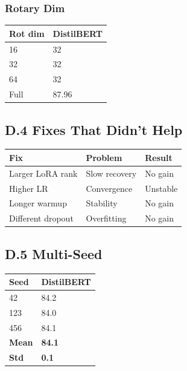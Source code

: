 {\subsubsection{Rotary Dim}

\begin{table}[H]
\centering
\small
\begin{tabular}{ll}
\toprule
\textbf{Rot dim} & \textbf{DistilBERT} \\
\midrule
16 & 32 \\
32 & 32 \\
64 & 32 \\
Full & 87.96 \\
\bottomrule
\end{tabular}
\end{table}

\subsection{D.4 Fixes That Didn't Help}

\begin{table}[H]
\centering
\small
\begin{tabular}{lll}
\toprule
\textbf{Fix} & \textbf{Problem} & \textbf{Result} \\
\midrule
Larger LoRA rank & Slow recovery & No gain \\
Higher LR & Convergence & Unstable \\
Longer warmup & Stability & No gain \\
Different dropout & Overfitting & No gain \\
\bottomrule
\end{tabular}
\end{table}

\subsection{D.5 Multi-Seed}

\begin{table}[H]
\centering
\small
\begin{tabular}{ll}
\toprule
\textbf{Seed} & \textbf{DistilBERT} \\
\midrule
42 & 84.2 \\
123 & 84.0 \\
456 & 84.1 \\
\textbf{Mean} & \textbf{84.1} \\
\textbf{Std} & \textbf{0.1} \\
\bottomrule
\end{tabular}
\end{table}

}
